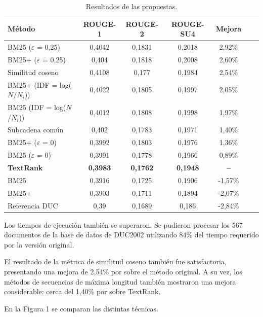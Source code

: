 \documentclass[a4paper]{article}
\begin{document}
\begin{table}
\caption{Resultados de las propuestas.}
\begin{center}
\begin{tabular}{l*{5}{c}r}
\hline
\rule{0pt}{12pt}
Método & ROUGE-1 & ROUGE-2 & ROUGE-SU4 & Mejora \\[2pt]
\hline\rule{0pt}{12pt}\mbox{}\par\nobreak
BM25 ($\varepsilon$ = 0,25) & 0,4042 & 0,1831 & 0,2018 & 2,92\% \\
BM25+ ($\varepsilon$ = 0,25) & 0,404 & 0,1818 & 0,2008 & 2,60\% \\
Similitud coseno & 0,4108 & 0,177 & 0,1984 & 2,54\% \\
BM25+ (IDF = log($N$/$N_i$)) & 0,4022 & 0,1805 & 0,1997 & 2,05\% \\ 
BM25 (IDF = log($N$/$N_i$)) & 0,4012 & 0,1808 & 0,1998 & 1,97\% \\ 
Subcadena común & 0,402 & 0,1783 & 0,1971 & 1,40\% \\
BM25+ ($\varepsilon$ = 0) & 0,3992 & 0,1803 & 0,1976 & 1,36\% \\ 
BM25 ($\varepsilon$ = 0) & 0,3991 & 0,1778 & 0,1966 & 0,89\% \\
\textbf{TextRank} & \textbf{0,3983} & \textbf{0,1762} & \textbf{0,1948} & \textbf{--}\\
BM25 & 0,3916 & 0,1725 & 0,1906 & -1,57\% \\
BM25+ & 0,3903 & 0,1711 & 0,1894 & -2,07\% \\
Referencia DUC & 0,39 & 0,1689 & 0,186 & -2,84\% \\ [2pt]
\hline
\end{tabular}
\end{center}
\end{table}


Los tiempos de ejecución también se superaron. Se pudieron procesar los 567 documentos de la base de datos de DUC2002 utilizando 84\% del tiempo requerido por la versión original.

El resultado de la métrica de similitud coseno también fue satisfactoria, presentando una mejora de 2,54\% por sobre el método original. A su vez, los métodos de secuencias de máxima longitud también mostraron una mejora considerable: cerca del 1,40\% por sobre TextRank. 

En la Figura 1 se comparan las distintas técnicas.
\end{document}
